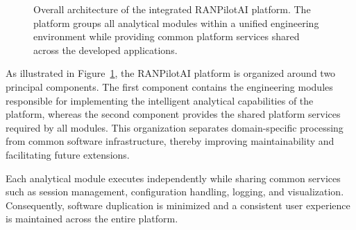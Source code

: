 \begin{figure}[H]

\caption{Overall architecture of the integrated RANPilotAI platform. The platform groups all analytical modules within a unified engineering environment while providing common platform services shared across the developed applications.}

\label{fig:platform_architecture}

\end{figure}

As illustrated in Figure~\ref{fig:platform_architecture}, the RANPilotAI platform is organized around two principal components. The first component contains the engineering modules responsible for implementing the intelligent analytical capabilities of the platform, whereas the second component provides the shared platform services required by all modules. This organization separates domain-specific processing from common software infrastructure, thereby improving maintainability and facilitating future extensions.

Each analytical module executes independently while sharing common services such as session management, configuration handling, logging, and visualization. Consequently, software duplication is minimized and a consistent user experience is maintained across the entire platform.
